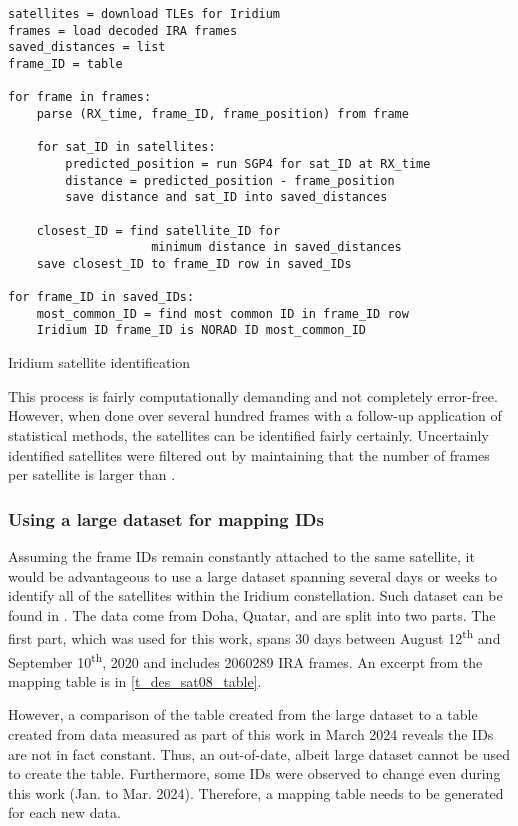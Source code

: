 \begin{algorithm}
    \centering
    \begin{verbatim}
satellites = download TLEs for Iridium
frames = load decoded IRA frames
saved_distances = list
frame_ID = table

for frame in frames:
    parse (RX_time, frame_ID, frame_position) from frame

    for sat_ID in satellites:
        predicted_position = run SGP4 for sat_ID at RX_time
        distance = predicted_position - frame_position
        save distance and sat_ID into saved_distances

    closest_ID = find satellite_ID for 
                    minimum distance in saved_distances
    save closest_ID to frame_ID row in saved_IDs

for frame_ID in saved_IDs:
    most_common_ID = find most common ID in frame_ID row
    Iridium ID frame_ID is NORAD ID most_common_ID
    \end{verbatim}
    \caption{Iridium satellite identification}
    \label{a_des_satellite_id}
\end{algorithm}


This process is fairly computationally demanding and not completely error-free. However, when done over several hundred frames with a follow-up application of statistical methods, the satellites can be identified fairly certainly. Uncertainly identified satellites were filtered out by maintaining that the number of frames per satellite is larger than .

\subsubsection{Using a large dataset for mapping IDs}
\label{s_des_sat08_id}
Assuming the frame IDs remain constantly attached to the same satellite, it would be advantageous to use a large dataset spanning several days or weeks to identify all of the satellites within the Iridium constellation. Such dataset can be found in \cite{sat08}. The data come from Doha, Quatar, and are split into two parts. The first part, which was used for this work, spans 30 days between August 12\textsuperscript{th} and September 10\textsuperscript{th}, 2020 and includes \num{2060289} IRA frames. An excerpt from the mapping table is in \autoref{t_des_sat08_table}.

However, a comparison of the table created from the large dataset to a table created from data measured as part of this work in March 2024 reveals the IDs are not in fact constant. Thus, an out-of-date, albeit large dataset cannot be used to create the table. Furthermore, some IDs were observed to change even during this work (Jan. to Mar. 2024). Therefore, a mapping table needs to be generated for each new data.

